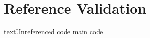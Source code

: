\documentclass[a4paper,12pt]{report}
\begin{document}
\chapter{Reference Validation}
\begin{code}{text}{Unreferenced code}
main code
\end{code}
\end{document}

